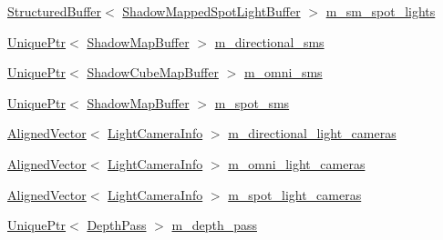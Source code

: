 \begin{DoxyCompactItemize}
\item 
\mbox{\hyperlink{classmage_1_1rendering_1_1_structured_buffer}{Structured\+Buffer}}$<$ \mbox{\hyperlink{structmage_1_1rendering_1_1_shadow_mapped_spot_light_buffer}{Shadow\+Mapped\+Spot\+Light\+Buffer}} $>$ \mbox{\hyperlink{classmage_1_1rendering_1_1_l_buffer_pass_aea554100305b5a5b198cfd579999fe8a}{m\+\_\+sm\+\_\+spot\+\_\+lights}}
\item 
\mbox{\hyperlink{namespacemage_a3316d7143a973e37adf1110f2e80ca31}{Unique\+Ptr}}$<$ \mbox{\hyperlink{classmage_1_1rendering_1_1_shadow_map_buffer}{Shadow\+Map\+Buffer}} $>$ \mbox{\hyperlink{classmage_1_1rendering_1_1_l_buffer_pass_a76627c9dc2cc229c07584dc2b2599db4}{m\+\_\+directional\+\_\+sms}}
\item 
\mbox{\hyperlink{namespacemage_a3316d7143a973e37adf1110f2e80ca31}{Unique\+Ptr}}$<$ \mbox{\hyperlink{classmage_1_1rendering_1_1_shadow_cube_map_buffer}{Shadow\+Cube\+Map\+Buffer}} $>$ \mbox{\hyperlink{classmage_1_1rendering_1_1_l_buffer_pass_acd46b497a33a96553fa804cb3ebee8ec}{m\+\_\+omni\+\_\+sms}}
\item 
\mbox{\hyperlink{namespacemage_a3316d7143a973e37adf1110f2e80ca31}{Unique\+Ptr}}$<$ \mbox{\hyperlink{classmage_1_1rendering_1_1_shadow_map_buffer}{Shadow\+Map\+Buffer}} $>$ \mbox{\hyperlink{classmage_1_1rendering_1_1_l_buffer_pass_ae3030c5dea15584fd575679c68c6adc8}{m\+\_\+spot\+\_\+sms}}
\item 
\mbox{\hyperlink{namespacemage_a8664bfb5ce2179fc64eae9f82c8a5ba8}{Aligned\+Vector}}$<$ \mbox{\hyperlink{structmage_1_1rendering_1_1_l_buffer_pass_1_1_light_camera_info}{Light\+Camera\+Info}} $>$ \mbox{\hyperlink{classmage_1_1rendering_1_1_l_buffer_pass_a89e1e0ae0ff65c26e18cd7e11e13523f}{m\+\_\+directional\+\_\+light\+\_\+cameras}}
\item 
\mbox{\hyperlink{namespacemage_a8664bfb5ce2179fc64eae9f82c8a5ba8}{Aligned\+Vector}}$<$ \mbox{\hyperlink{structmage_1_1rendering_1_1_l_buffer_pass_1_1_light_camera_info}{Light\+Camera\+Info}} $>$ \mbox{\hyperlink{classmage_1_1rendering_1_1_l_buffer_pass_acf230dbad022cf28a4b87c38ff3439d1}{m\+\_\+omni\+\_\+light\+\_\+cameras}}
\item 
\mbox{\hyperlink{namespacemage_a8664bfb5ce2179fc64eae9f82c8a5ba8}{Aligned\+Vector}}$<$ \mbox{\hyperlink{structmage_1_1rendering_1_1_l_buffer_pass_1_1_light_camera_info}{Light\+Camera\+Info}} $>$ \mbox{\hyperlink{classmage_1_1rendering_1_1_l_buffer_pass_aa888c81683fc9be4cdfab1a49d03eac3}{m\+\_\+spot\+\_\+light\+\_\+cameras}}
\item 
\mbox{\hyperlink{namespacemage_a3316d7143a973e37adf1110f2e80ca31}{Unique\+Ptr}}$<$ \mbox{\hyperlink{classmage_1_1rendering_1_1_depth_pass}{Depth\+Pass}} $>$ \mbox{\hyperlink{classmage_1_1rendering_1_1_l_buffer_pass_a0c721ac882c34c5d6fd6893407fa84f8}{m\+\_\+depth\+\_\+pass}}
\end{DoxyCompactItemize}


